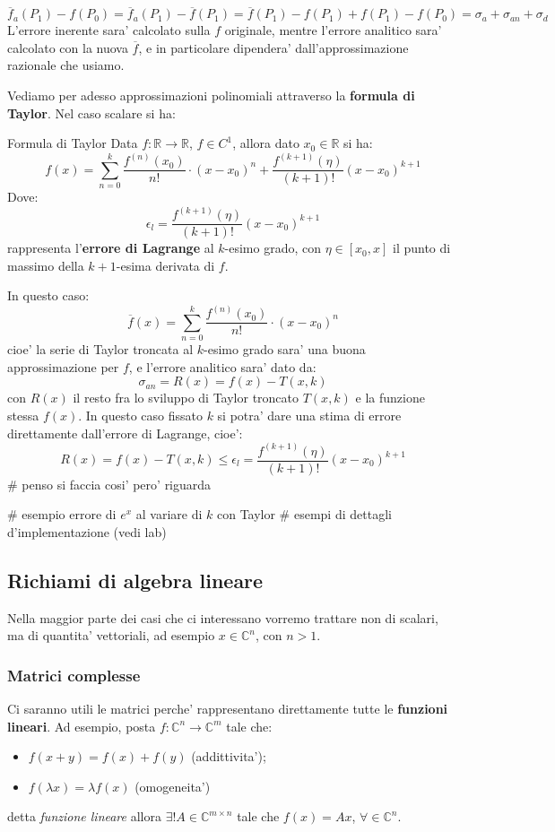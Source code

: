 \documentclass[a4paper,11pt]{article}
\begin{document}
$$
\overline{f}_a (P_1) - f(P_0) = \overline{f}_a (P_1) - \overline{f} (P_1) = \overline{f} (P_1) - f(P_1) + f(P_1) - f(P_0) = \sigma_a + \sigma_{an} + \sigma_d
$$
	L'errore inerente sara' calcolato sulla $f$ originale, mentre l'errore analitico sara' calcolato con la nuova $\overline{f}$, e in particolare dipendera' dall'approssimazione razionale che usiamo.

Vediamo per adesso approssimazioni polinomiali attraverso la \textbf{formula di Taylor}. Nel caso scalare si ha:

\begin{theorem}{Formula di Taylor}
	Data $f : \mathbb{R} \rightarrow \mathbb{R}$, $f \in C^1$, allora dato $x_0 \in \mathbb{R}$ si ha:
	$$
	f(x) = \sum_{n = 0}^k \frac{ f^{(n)}(x_0) }{ n! } \cdot (x - x_0)^n + \frac{ f^{(k + 1)} ( \eta ) }{(k + 1)!} (x - x_0)^{k + 1} 
	$$
	Dove:
	$$
		\epsilon_l = \frac{ f^{(k + 1)} ( \eta ) }{(k + 1)!} (x - x_0)^{k + 1}
	$$
	rappresenta l'\textbf{errore di Lagrange} al $k$-esimo grado, con $\eta \in [x_0, x]$ il punto di massimo della $k + 1$-esima derivata di $f$.
\end{theorem}

In questo caso:
$$
\overline{f}(x) = \sum_{n = 0}^k \frac{ f^{(n)}(x_0) }{ n! } \cdot (x - x_0)^n
$$
cioe' la serie di Taylor troncata al $k$-esimo grado sara' una buona approssimazione per $f$, e l'errore analitico sara' dato da:
$$
\sigma_{an} = R(x) = f(x) - T(x, k) 
$$
		con $R(x)$ il resto fra lo sviluppo di Taylor troncato $T(x, k)$ e la funzione stessa $f(x)$.
In questo caso fissato $k$ si potra' dare una stima di errore direttamente dall'errore di Lagrange, cioe':
$$
R(x) = f(x) - T(x, k) \leq \epsilon_l = \frac{ f^{(k + 1)} ( \eta ) }{(k + 1)!} (x - x_0)^{k + 1}
$$ # penso si faccia cosi' pero' riguarda

# esempio errore di $e^x$ al variare di $k$ con Taylor
# esempi di dettagli d'implementazione (vedi lab)

\subsection{Richiami di algebra lineare}
Nella maggior parte dei casi che ci interessano vorremo trattare non di scalari, ma di quantita' vettoriali, ad esempio $x \in \mathbb{C}^n$, con $n > 1$.

\subsubsection{Matrici complesse}
Ci saranno utili le matrici perche' rappresentano direttamente tutte le \textbf{funzioni lineari}. 
Ad esempio, posta $f: \mathbb{C}^n \rightarrow \mathbb{C}^m$ tale che:
\begin{itemize}
	\item $ f(x + y) = f(x) + f(y) $ (addittivita');
	\item $f(\lambda x) = \lambda f(x)$ (omogeneita')
\end{itemize}
detta \textit{funzione lineare} allora $\exists ! A \in \mathbb{C}^{m \times n}$ tale che $f(x) = A x$,  $\forall \in \mathbb{C}^n$.
\end{document}
